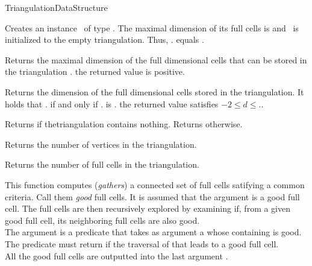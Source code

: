 \begin{ccRefConcept}{TriangulationDataStructure}
\ccCreation
{}

 {Creates an instance \ccVar\ of
type \ccRefName. The maximal dimension of its full cells is  and
\ccVar\ is initialized to the empty triangulation. Thus,
\ccVar. equals .}



 { Returns the maximal dimension of
the full dimensional cells that can be stored in the triangulation \ccVar. \ccPostcond the
returned value is positive. }

 { Returns the dimension of the
full dimensional cells stored in the triangulation. It holds that
\ccVar. if and only if \ccVar. is
. \ccPostcond the returned value  satisfies 
$-2\leq d \leq$\ccVar.. }

 { Returns  if thetriangulation
contains nothing. Returns  otherwise. }

{Returns the number of vertices in the triangulation.}

{Returns the number of full cells  in the triangulation.}

{}

{}

{This function computes (\emph{gathers}) a connected set of full cells
satifying a common criteria. Call them \emph{good} full cells. It is assumed
that the argument  is a good full cell. The full cells are then
recursively explored by examining if, from a given good full cell, its neighboring
full cells are also good.\\
The argument  is a predicate that takes as argument a 
whose containing  is good. The predicate must return 
if the traversal of that  leads to a good full cell.\\
All the good full cells are outputted into the last argument .}


\end{ccRefConcept}
